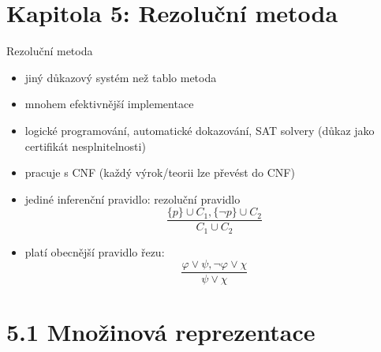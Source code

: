 \documentclass{beamer}
\begin{document}
\section{\sc Kapitola 5: Rezoluční metoda}


\begin{frame}{Rezoluční metoda}
    
    \begin{itemize}
        \item jiný důkazový systém než tablo metoda
        \item mnohem efektivnější implementace
        \item logické programování, automatické dokazování, SAT solvery (důkaz jako \alert{certifikát} nesplnitelnosti)
        \item pracuje s CNF (každý výrok/teorii lze převést do CNF)
        \item jediné inferenční pravidlo: \alert{rezoluční pravidlo}
        $$
        \frac{\{p\}\cup C_1,\{\neg p\}\cup C_2}{C_1\cup C_2}
        $$
        \item platí obecnější \alert{pravidlo řezu}:
        $$
        \frac{\varphi\lor\psi,\neg\varphi\lor\chi}{\psi\lor\chi}
        $$
    \end{itemize}

\end{frame}


\section{5.1 Množinová reprezentace}
\end{document}
